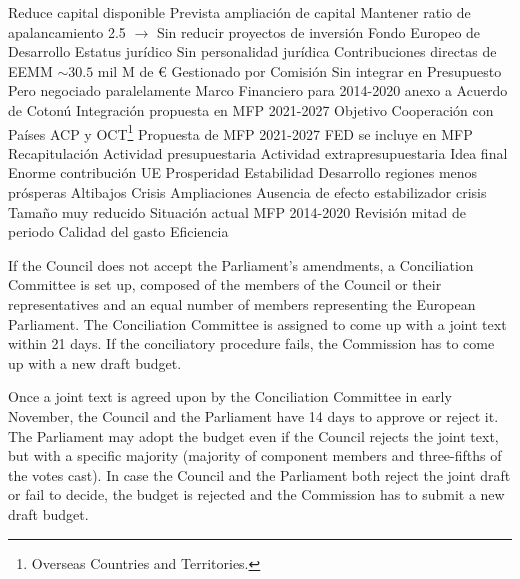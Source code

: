 \documentclass{nuevotema}
\begin{document}
\begin{esquemal}
				\4[] Reduce capital disponible
				\4 Prevista ampliación de capital
				\4[] Mantener ratio de apalancamiento 2.5
				\4[] $\to$ Sin reducir proyectos de inversión
		\2 Fondo Europeo de Desarrollo
			\3 Estatus jurídico
				\4 Sin personalidad jurídica
				\4 Contribuciones directas de EEMM
				\4[] $\sim 30.5$ mil M de €
				\4 Gestionado por Comisión
				\4 Sin integrar en Presupuesto
				\4[] Pero negociado paralelamente
				\4[] Marco Financiero para 2014-2020 anexo a Acuerdo de Cotonú
				\4[] Integración propuesta en MFP 2021-2027
			\3 Objetivo
				\4 Cooperación con Países ACP y OCT\footnote{Overseas Countries and Territories.}
			\3 Propuesta de MFP 2021-2027
				\4 FED se incluye en MFP
	\1[] 
		\2 Recapitulación
			\3 Actividad presupuestaria
			\3 Actividad extrapresupuestaria
		\2 Idea final
			\3 Enorme contribución UE
				\4 Prosperidad
				\4 Estabilidad
				\4 Desarrollo regiones menos prósperas
			\3 Altibajos \4 Crisis
				\4 Ampliaciones
				\4 Ausencia de efecto estabilizador crisis
				\4[] Tamaño muy reducido
			\3 Situación actual
				\4 MFP 2014-2020
				\4 Revisión mitad de periodo
				\4 Calidad del gasto
				\4 Eficiencia
\end{esquemal}



































\conceptos


If the Council does not accept the Parliament's amendments, a Conciliation Committee is set up, composed of the members of the Council or their representatives and an equal number of members representing the European Parliament. The Conciliation Committee is assigned to come up with a joint text within 21 days. If the conciliatory procedure fails, the Commission has to come up with a new draft budget.

Once a joint text is agreed upon by the Conciliation Committee in early November, the Council and the Parliament have 14 days to approve or reject it. The Parliament may adopt the budget even if the Council rejects the joint text, but with a specific majority (majority of component members and three-fifths of the votes cast). In case the Council and the Parliament both reject the joint draft or fail to decide, the budget is rejected and the Commission has to submit a new draft budget.
\end{document}
